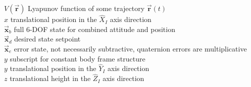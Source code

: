 \documentclass[a4paper, 11pt, oneside, openright, parskip=full]{book}
\begin{document}
$V(\vec{\mathbf{r}})$ Lyapunov function of some trajectory $\vec{\mathbf{r}}(t)$\\
$x$ translational position in the $\hat{X}_I$ axis direction\\
$\vec{\mathbf{x}}_b$ full 6-DOF state for combined attitude and position\\
$\vec{\mathbf{x}}_d$ desired state setpoint\\
$\vec{\mathbf{x}}_e$ error state, not necessarily subtractive, quaternion errors are multiplicative\\
$y$ subscript for constant body frame structure\\
$y$ translational position in the $\hat{Y}_I$ axis direction\\
$z$ translational height in the $\hat{Z}_I$ axis direction\\


















\tableofcontents

\listoffigures

\listoftables


\end{document}
